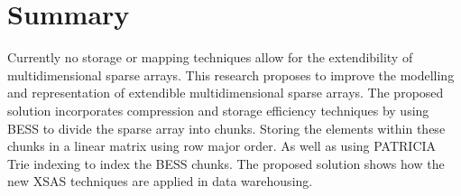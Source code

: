%
%
%
%
%
\chapter{Summary} \label{chap:summary}
\vspace{-1cm}
Currently no storage or mapping techniques allow for the extendibility of multidimensional sparse arrays. This research proposes to improve the modelling and representation of extendible multidimensional sparse arrays. The proposed solution incorporates compression and storage efficiency techniques by using BESS to divide the sparse array into chunks. Storing the elements within these chunks in a linear matrix using row major order. As well as using PATRICIA Trie indexing to index the BESS chunks. The proposed solution shows how the new XSAS techniques are applied in data warehousing.